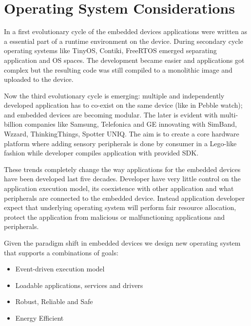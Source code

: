 \section{Operating System Considerations}
\label{os-considerations}

In a first evolutionary cycle of the embedded devices applications were written
as a essential part of a runtime environment on the device. During secondary
cycle operating systems like TinyOS, Contiki, FreeRTOS emerged separating
application and OS spaces. The development became easier  and applications
got complex but the resulting code was still compiled to a monolithic image and
uploaded to the device.

Now the third evolutionary cycle is emerging: multiple and independently
developed application has to co-exist on the same device (like in Pebble watch);
and embedded devices are becoming modular. The later is evident with
multi-billion companies like Samsung, Telefonica and GE innovating with SimBand, Wzzard, ThinkingThings, Spotter UNIQ.
The aim is to create a core hardware platform where adding sensory
peripherals is done by consumer in a Lego-like fashion while developer compiles
application with provided SDK.

These trends completely change the way applications for the embedded devices
have been developed last five decades. Developer have very little control on the
application execution model, its coexistence with other application and what
peripherals are connected to the embedded device. Instead application developer
expect that underlying operating system will perform fair resource allocation,
protect the application from malicious or malfunctioning applications and
peripherals. 

Given the paradigm shift in embedded devices we design new operating system
\name that supports a combinations of goals:


\begin{itemize}
  \item Event-driven execution model
  \item Loadable applications, services and drivers
  \item Robust, Reliable and Safe %
  \item Energy Efficient 
\end{itemize}



